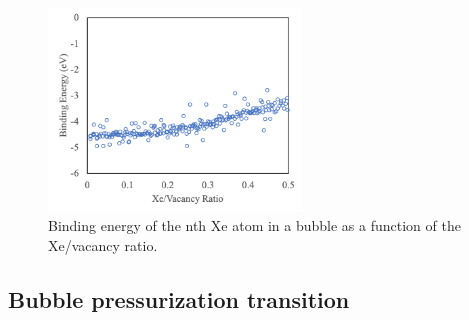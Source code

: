 \documentclass[review]{elsarticle}
\begin{document}
\begin{figure}[h]
 \centering
 \includegraphics[width=0.6\textwidth]{4_binding.png} 
 \caption{Binding energy of the nth Xe atom in a bubble as a function of the Xe/vacancy ratio.}
 \label{fig:binding}
\end{figure}

\FloatBarrier

\subsection{Bubble pressurization transition}
\end{document}
